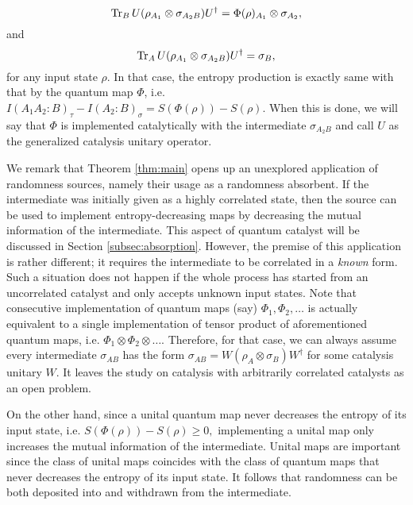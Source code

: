 \documentclass[aps, reprint, amsmath,amssymb, prx, superscriptaddress]{revtex4-2}
\begin{document}
\begin{equation}
      \Tr_B U(\rho_{A_1} \otimes \sigma_{A_2B})U^\dag = \Phi(\rho)_{A_1}\otimes\sigma_{A_2},
\end{equation}
and
\begin{equation}
      \Tr_{A} U(\rho_{A_1} \otimes \sigma_{A_2B})U^\dag = \sigma_{B},
\end{equation}
 for any input state $\rho$. In that case, the entropy production is exactly same with that by the quantum map $\Phi$, i.e. $I(A_1A_2:B)_\tau - I(A_2:B)_\sigma = S(\Phi(\rho))-S(\rho).$ When this is done, we will say that $\Phi$ is implemented catalytically with the intermediate $\sigma_{A_2B}$ and call $U$ as the generalized catalysis unitary operator.
 
 
 

 We remark that Theorem \ref{thm:main} opens up an unexplored application of randomness sources, namely their usage as a randomness absorbent. If the intermediate was initially given as a highly correlated state, then the source can be used to implement entropy-decreasing maps by decreasing the mutual information of the intermediate. This aspect of quantum catalyst will be discussed in Section  \ref{subsec:absorption}. However, the premise of this application is rather different; it requires the intermediate to be correlated in a \textit{known} form. Such a situation does not happen if the whole process has started from an uncorrelated catalyst and only accepts unknown input states. Note that consecutive implementation of quantum maps (say) $\Phi_1, \Phi_2, \dots$ is actually equivalent to a single implementation of tensor product of aforementioned quantum maps, i.e. $\Phi_1 \otimes \Phi_2 \otimes \dots$. Therefore, for that case, we can always assume every intermediate $\sigma_{AB}$ has the form $\sigma_{AB}=W(\rho_A\otimes \sigma_B)W^\dag$ for some catalysis unitary $W$. It leaves the study on catalysis with arbitrarily correlated catalysts as an open problem. 
 


On the other hand, since a unital quantum map never decreases the entropy of its input state, i.e. $S(\Phi(\rho))-S(\rho) \geq 0,$ implementing a unital map only increases the mutual information of the intermediate. Unital maps are important since the class of unital maps coincides with the class of quantum maps that never decreases the entropy of its input state. It follows that randomness can be both deposited into and withdrawn from the intermediate.
\end{document}
